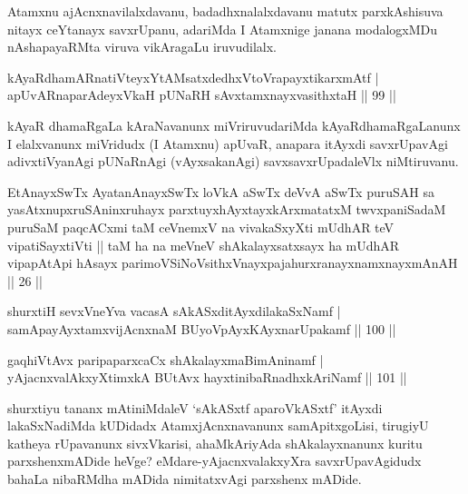 \begin{artha}
Atamxnu ajAcnxnavilalxdavanu, badadhxnalalxdavanu matutx parxkAshisuva nitayx ceYtanayx savxrUpanu, adariMda I Atamxnige janana modalogxMDu nAshapayaRMta viruva vikAragaLu iruvudilalx.
\end{artha}

\begin{shl}
kAyaRdhamARnatiVteyxYtAMsatxdedhxVtoVrapayxtikarxmAtf |\\
apUvARnaparAdeyxVkaH pUNaRH sAvxtamxnayxvasithxtaH \hfill || 99 ||
\end{shl}

\begin{artha}
kAyaR dhamaRgaLa kAraNavanunx miVriruvudariMda kAyaRdhamaRgaLanunx I elalxvanunx miVridudx (I Atamxnu) apUvaR, anapara itAyxdi savxrUpavAgi adivxtiVyanAgi pUNaRnAgi (vAyxsakanAgi) savxsavxrUpadaleVlx niMtiruvanu.
\end{artha}

\begin{shl}
EtAnayxSwTx AyatanAnayxSwTx loVkA aSwTx deVvA aSwTx puruSAH sa yasAtxnupxruSAninxruhayx parxtuyxhAyxtayxkArxmatatxM twvxpaniSadaM puruSaM paqcACxmi taM ceVnemxV na vivakaSxyXti mUdhAR teV vipatiSayxtiVti || taM ha na meVneV shAkalayxsatxsayx ha mUdhAR vipapAtApi hAsayx parimoVSiNoV\s sithxVnayxpajahurxranayxnamxnayxmAnAH || 26 ||
\end{shl}

\begin{shl}
shurxtiH sevxVneYva vacasA sAkASxditAyxdilakaSxNamf |\\
samApayAyx\s \s tamxvijAcnxnaM BUyoV\s pAyxKAyxnarUpakamf \hfill || 100 ||
\end{shl}

\begin{shl}
gaqhiVtAvx paripaparxcaCx shAkalayxmaBimAninamf |\\
yAjacnxvalAkxyXtimxkA BUtAvx hayxtinibaRnadhxkAriNamf \hfill || 101 ||
\end{shl}

\begin{artha}%
shurxtiyu tananx mAtiniMdaleV `sAkASxtf aparoVkASxtf' itAyxdi lakaSxNadiMda kUDidadx AtamxjAcnxnavanunx samApitxgoLisi, tirugiyU katheya rUpavanunx sivxVkarisi, ahaMkAriyAda shAkalayxnanunx kuritu parxshenxmADide heVge? eMdare-yAjacnxvalakxyXra savxrUpavAgidudx bahaLa nibaRMdha mADida nimitatxvAgi parxshenx mADide.
\end{artha}


